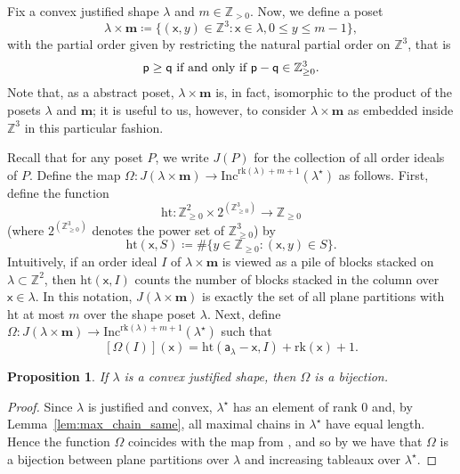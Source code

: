 \documentclass[12pt]{amsart}
\newcommand{\x}{\ensuremath{\mathsf{x}}}
\newcommand{\aaa}{\ensuremath{\mathsf{a}}}
\newtheorem{proposition}[theorem]{Proposition}
\theoremstyle{definition}
\theoremstyle{remark}
\numberwithin{equation}{section}
\newcommand{\inc}{\ensuremath{\mathrm{Inc}}}
\newcommand{\rank}{\ensuremath{\mathrm{rk}}}
\begin{document}
Fix a convex justified shape $\lambda$ and $m \in \mathbb{Z}_{> 0}$. Now, we define a poset
\[
\lambda \times \mathbf{m} \coloneqq \{ (\x, y) \in \mathbb{Z}^3: \x \in \lambda, 0 \leq y \leq  m-1 \},
\] with the partial order given by restricting the natural partial order on $\mathbb{Z}^3$, that is
\[{\sf p} \geq {\sf q} \text{ if and only if } {\sf p}  - {\sf q} \in \mathbb{Z}_{\geq 0}^3.\] Note that, as a abstract poset, $\lambda \times \mathbf{m}$ is, in fact, isomorphic to the product of the posets $\lambda$ and $\mathbf{m}$; it is useful to us, however, to consider $\lambda \times \mathbf{m}$ as embedded inside $\mathbb{Z}^3$ in this particular fashion.


Recall that for any poset $P$, we write $J(P)$ for the collection of all order ideals of $P$.  
 Define the map $\Omega : J(\lambda \times \mathbf{m}) \rightarrow \inc^{\rank(\lambda)+ m+1}(\lambda^\star)$ as follows. 
 First, define the function 
 \[
 \mathrm{ht}: \mathbb{Z}_{\geq 0}^2 \times 2^{(\mathbb{Z}_{\geq 0}^3)} \rightarrow \mathbb{Z}_{\geq 0}
 \] (where $2^{(\mathbb{Z}_{\geq 0}^3)}$ denotes the power set of $\mathbb{Z}_{\geq 0}^3$) by 
 \[ \mathrm{ht}(\x,S) \coloneqq  \# \{ y \in \mathbb{Z}_{\geq 0} : (\x,y) \in S \}.  \]  
Intuitively, if an order ideal $I$ of $\lambda \times \mathbf{m}$ is viewed as a pile of blocks stacked on $\lambda \subset \mathbb{Z}^2$, then $\mathrm{ht}(\x,I)$ counts the number of blocks stacked in the column over $\x \in \lambda$. In this notation, $J(\lambda \times \mathbf{m})$ is exactly the set of all plane partitions with $\mathrm{ht}$ at most $m$ over the shape poset $\lambda$. Next, define $\Omega: J(\lambda \times \mathbf{m}) \rightarrow \inc^{\rank(\lambda) + m + 1}(\lambda^{\star})$ such that 
\[ [\Omega(I)]( \x )= \mathrm{ht}(\aaa_\lambda - \x,I) + \rank(\x)+1.\] 

\begin{proposition}\label{prop:bijection}
If $\lambda$ is a convex justified shape, then  $\Omega$ is a bijection.
\end{proposition}
\begin{proof}
Since $\lambda$ is justified and convex, $\lambda^\star$ has an element of rank $0$ and, by Lemma~\ref{lem:max_chain_same}, all maximal chains in $\lambda^\star$ have equal length. Hence the function $\Omega$ coincides with the map from \cite[Proposition~8.2]{HPPW}, and so by \cite[Proposition~8.2]{HPPW} we have that $\Omega$ is a bijection between plane partitions over $\lambda$ and increasing tableaux over $\lambda^\star$.
\end{proof}
\end{document}
